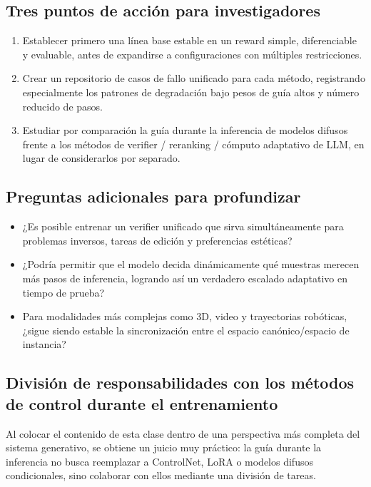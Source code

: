 \documentclass[a4paper]{article}
\begin{document}
\subsection{Tres puntos de acción para investigadores}

\begin{enumerate}
    \item Establecer primero una línea base estable en un reward simple, diferenciable y evaluable, antes de expandirse a configuraciones con múltiples restricciones.
    \item Crear un repositorio de casos de fallo unificado para cada método, registrando especialmente los patrones de degradación bajo pesos de guía altos y número reducido de pasos.
    \item Estudiar por comparación la guía durante la inferencia de modelos difusos frente a los métodos de verifier / reranking / cómputo adaptativo de LLM, en lugar de considerarlos por separado.
\end{enumerate}

\subsection{Preguntas adicionales para profundizar}

\begin{itemize}
    \item ¿Es posible entrenar un verifier unificado que sirva simultáneamente para problemas inversos, tareas de edición y preferencias estéticas?
    \item ¿Podría permitir que el modelo decida dinámicamente qué muestras merecen más pasos de inferencia, logrando así un verdadero escalado adaptativo en tiempo de prueba?
    \item Para modalidades más complejas como 3D, video y trayectorias robóticas, ¿sigue siendo estable la sincronización entre el espacio canónico/espacio de instancia?
\end{itemize}

\subsection{División de responsabilidades con los métodos de control durante el entrenamiento}

Al colocar el contenido de esta clase dentro de una perspectiva más completa del sistema generativo, se obtiene un juicio muy práctico: la guía durante la inferencia no busca reemplazar a ControlNet, LoRA o modelos difusos condicionales, sino colaborar con ellos mediante una división de tareas.
\end{document}
